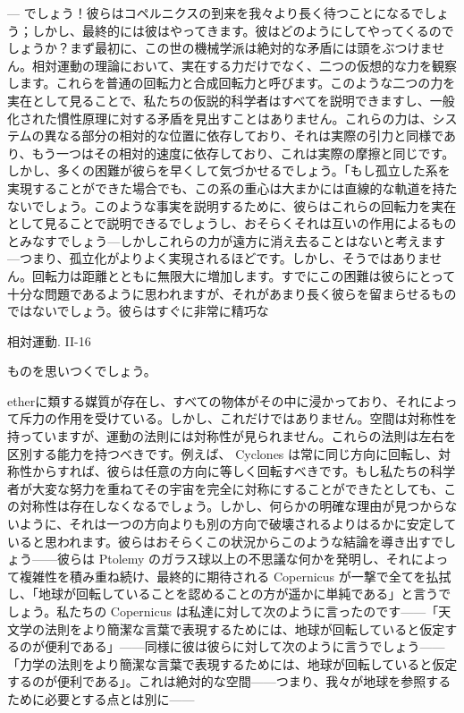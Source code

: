 \documentclass[a4paper,11pt,openany]{ltjsbook}
\begin{document}
— でしょう！彼らはコペルニクスの到来を我々より長く待つことになるでしょう；しかし、最終的には彼はやってきます。彼はどのようにしてやってくるのでしょうか？まず最初に、この世の機械学派は絶対的な矛盾には頭をぶつけません。相対運動の理論において、実在する力だけでなく、二つの仮想的な力を観察します。これらを普通の回転力と合成回転力と呼びます。このような二つの力を実在として見ることで、私たちの仮説的科学者はすべてを説明できますし、一般化された慣性原理に対する矛盾を見出すことはありません。これらの力は、システムの異なる部分の相対的な位置に依存しており、それは実際の引力と同様であり、もう一つはその相対的速度に依存しており、これは実際の摩擦と同じです。しかし、多くの困難が彼らを早くして気づかせるでしょう。「もし孤立した系を実現することができた場合でも、この系の重心は大まかには直線的な軌道を持たないでしょう。このような事実を説明するために、彼らはこれらの回転力を実在として見ることで説明できるでしょうし、おそらくそれは互いの作用によるものとみなすでしょう—しかしこれらの力が遠方に消え去ることはないと考えます—つまり、孤立化がよりよく実現されるほどです。しかし、そうではありません。回転力は距離とともに無限大に増加します。すでにこの困難は彼らにとって十分な問題であるように思われますが、それがあまり長く彼らを留まらせるものではないでしょう。彼らはすぐに非常に精巧な

相対運動. II-16

ものを思いつくでしょう。

etherに類する媒質が存在し、すべての物体がその中に浸かっており、それによって斥力の作用を受けている。しかし、これだけではありません。空間は対称性を持っていますが、運動の法則には対称性が見られません。これらの法則は左右を区別する能力を持つべきです。例えば、 Cyclones は常に同じ方向に回転し、対称性からすれば、彼らは任意の方向に等しく回転すべきです。もし私たちの科学者が大変な努力を重ねてその宇宙を完全に対称にすることができたとしても、この対称性は存在しなくなるでしょう。しかし、何らかの明確な理由が見つからないように、それは一つの方向よりも別の方向で破壊されるよりはるかに安定していると思われます。彼らはおそらくこの状況からこのような結論を導き出すでしょう——彼らは Ptolemy のガラス球以上の不思議な何かを発明し、それによって複雑性を積み重ね続け、最終的に期待される Copernicus が一撃で全てを払拭し、「地球が回転していることを認めることの方が遥かに単純である」と言うでしょう。私たちの Copernicus は私達に対して次のように言ったのです——「天文学の法則をより簡潔な言葉で表現するためには、地球が回転していると仮定するのが便利である」——同様に彼は彼らに対して次のように言うでしょう——「力学の法則をより簡潔な言葉で表現するためには、地球が回転していると仮定するのが便利である」。これは絶対的な空間——つまり、我々が地球を参照するために必要とする点とは別に——
\end{document}
